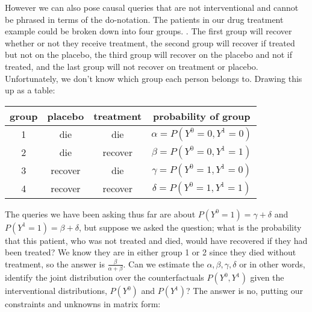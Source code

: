 However we can also pose causal queries that are not interventional and cannot be phrased in terms of the do-notation. The patients in our drug treatment example could be broken down into four groups. . The first group will recover whether or not they receive treatment, the second group will recover if treated but not on the placebo, the third group will recover on the placebo and not if treated, and the last group will not recover on treatment or placebo. Unfortunately, we don't know which group each person belongs to. Drawing this up as a table:

\begin{tabular}{c|c|c|c}
group & placebo & treatment & probability of group\\
\hline
1 & die & die & $\alpha=P(Y^{0}=0,Y^{1}=0)$\\
2 & die & recover & $\beta=P(Y^{0}=0,Y^{1}=1)$\\
3 & recover & die & $\gamma=P(Y^{0}=1,Y^{1}=0)$\\
4 & recover & recover & $\delta=P(Y^{0}=1,Y^{1}=1)$\\
\end{tabular}

The queries we have been asking thus far are about $P(Y^{0}=1) = \gamma + \delta$ and $P(Y^{1}=1) = \beta + \delta$, but suppose we asked the question; what is the probability that this patient, who was not treated and died, would have recovered if they had been treated? We know they are in either group 1 or 2 since they died without treatment, so the answer is $\frac{\beta}{\alpha+\beta}$. Can we estimate the $\alpha, \beta, \gamma, \delta$ or in other words, identify the joint distribution over the counterfactuals $P(Y^{0},Y^{1})$ given the interventional distributions, $P(Y^{0})$ and $P(Y^{1})$? The answer is no, putting our constraints and unknowns in matrix form:

